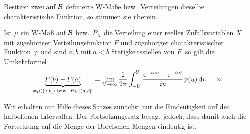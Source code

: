 \begin{prop}
\label{prop:6.4}
Besitzen zwei auf ${\mathcal{B}}$ definierte W-Maße bzw.\ Verteilungen dieselbe
charakteristische Funktion, so stimmen sie überein.

Ist $\mu $ ein W-Maß auf
${\mathcal{B}}$ bzw.\ $P_{X}$ die Verteilung einer reellen Zufallsvariablen $X$ mit
zugehöriger Verteilungsfunktion $F$ und zugehöriger charakteristischer
Funktion $\varphi $ und sind $a,b$ mit $a<b$ Stetigkeitsstellen von $F$, so
gilt die Umkehrformel
\begin{align*}
\underbrace{F(b) -F(a)}_{{ = \mu ((a,b])  \text{ bzw. } P_{X}((a,b])}}
= \lim\limits_{U\to \infty} \frac{1}{2\pi}  \int^ {U}_{-U} \frac{\e^ {-iua}-\e^
{-iub}}{iu} \ph (u) \du.\fishhere
\end{align*}
\end{prop}

Wir erhalten mit Hilfe dieses Satzes zunächst nur die Eindeutigkeit auf den
halboffenen Intervallen. Der Fortsetzungssatz besagt jedoch, dass damit auch
die Fortsetzung auf die Menge der Borelschen Mengen eindeutig ist.

